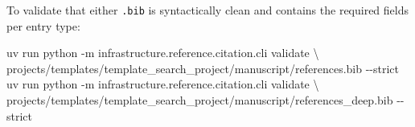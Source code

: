 \documentclass[
]{article}
\newenvironment{Shaded}{}{}
\newcommand{\AttributeTok}[1]{\textcolor[rgb]{0.49,0.56,0.16}{#1}}
\newcommand{\DataTypeTok}[1]{\textcolor[rgb]{0.56,0.13,0.00}{#1}}
\newcommand{\ExtensionTok}[1]{#1}
\newcommand{\NormalTok}[1]{#1}
\begin{document}
To validate that either \texttt{.bib} is syntactically clean and
contains the required fields per entry type:

\begin{Shaded}
\begin{Highlighting}[]
\ExtensionTok{uv}\NormalTok{ run python }\AttributeTok{{-}m}\NormalTok{ infrastructure.reference.citation.cli validate }\DataTypeTok{\textbackslash{}}
\NormalTok{    projects/templates/template\_search\_project/manuscript/references.bib }\AttributeTok{{-}{-}strict}
\ExtensionTok{uv}\NormalTok{ run python }\AttributeTok{{-}m}\NormalTok{ infrastructure.reference.citation.cli validate }\DataTypeTok{\textbackslash{}}
\NormalTok{    projects/templates/template\_search\_project/manuscript/references\_deep.bib }\AttributeTok{{-}{-}strict}
\end{Highlighting}
\end{Shaded}




\clearpage


\end{document}

